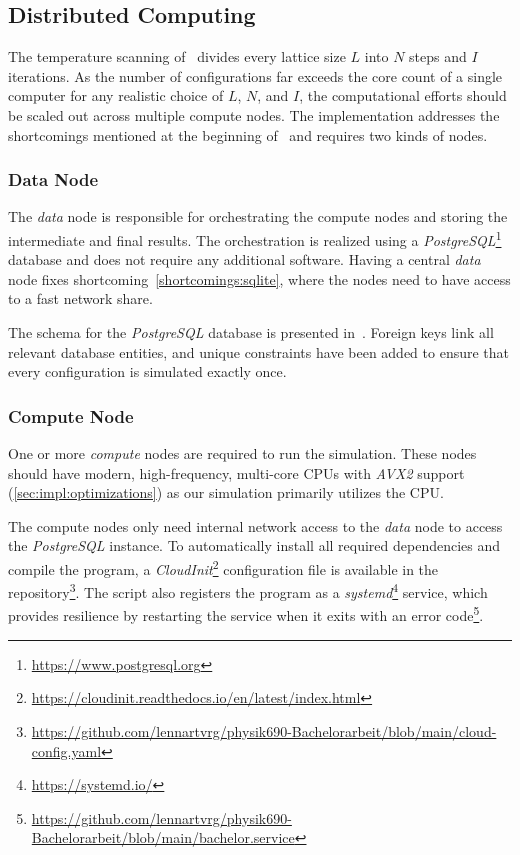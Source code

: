 \subsection{Distributed Computing}\label{sec:impl:computing}
	The temperature scanning of~ divides every lattice size $L$ into $N$ steps and $I$ iterations. As the number of configurations far exceeds the core count of a single computer for any realistic choice of $L$, $N$, and $I$, the computational efforts should be scaled out across multiple compute nodes. The implementation addresses the shortcomings mentioned at the beginning of~ and requires two kinds of nodes.
	
	\subsubsection{Data Node}\label{sec:impl:computing:data}
		The \emph{data} node is responsible for orchestrating the compute nodes and storing the intermediate and final results. The orchestration is realized using a  \emph{PostgreSQL}\footnote{\url{https://www.postgresql.org}} database and does not require any additional software. Having a central \emph{data} node fixes shortcoming~\cref{shortcomings:sqlite}, where the nodes need to have access to a fast network share.
		
		The schema for the \emph{PostgreSQL} database is presented in~. Foreign keys link all relevant database entities, and unique constraints have been added to ensure that every configuration is simulated exactly once.
	
	\subsubsection{Compute Node}\label{sec:impl:computing:compute}
		One or more \emph{compute} nodes are required to run the simulation. These nodes should have modern, high-frequency, multi-core CPUs with \emph{AVX2} support (\cref{sec:impl:optimizations}) as our simulation primarily utilizes the CPU.
		
		The compute nodes only need internal network access to the \emph{data} node to access the \emph{PostgreSQL} instance. To automatically install all required dependencies and compile the program, a \emph{CloudInit}\footnote{\url{https://cloudinit.readthedocs.io/en/latest/index.html}} configuration file is available in the repository\footnote{\url{https://github.com/lennartvrg/physik690-Bachelorarbeit/blob/main/cloud-config.yaml}}. The script also registers the program as a \emph{systemd}\footnote{\url{https://systemd.io/}} service, which provides resilience by restarting the service when it exits with an error code\footnote{\url{https://github.com/lennartvrg/physik690-Bachelorarbeit/blob/main/bachelor.service}}.
